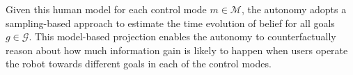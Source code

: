 \documentclass[letterpaper, 10 pt, conference]{ieeeconf}  %
\newcommand{\argmax}{\arg\!\max}
\newcommand{\norm}[1]{\left\lVert#1\right\rVert}
\begin{document}
Given this human model for each control mode $m \in \mathcal{M}$, the autonomy adopts a sampling-based approach to estimate the time evolution of belief for all goals $g \in \mathcal{G}$. This model-based projection enables the autonomy to counterfactually reason about how much information gain is likely to happen when users operate the robot towards different goals in each of the control modes. 

%

\end{document}
